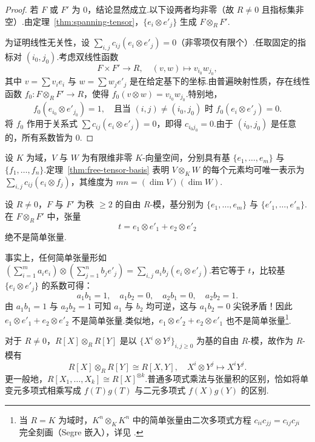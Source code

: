 \begin{proof}
若 $F$ 或 $F'$ 为 $0$，结论显然成立.以下设两者均非零（故 $R \neq 0$ 且指标集非空）.由定理~\ref{thm:spanning-tensor}，$\{e_i \otimes e'_j\}$ 生成 $F \otimes_R F'$.

为证明线性无关性，设 $\sum_{i, j} c_{ij} (e_i \otimes e'_j) = 0$（非零项仅有限个）.任取固定的指标对 $(i_0, j_0)$.考虑双线性函数
\[
  F \times F' \to R, \quad (v, w) \mapsto v_{i_0} w_{j_0},
\]
其中 $v = \sum v_i e_i$ 与 $w = \sum w_j e'_j$ 是在给定基下的坐标.由普遍映射性质，存在线性函数 $f_0 \colon F \otimes_R F' \to R$，使得 $f_0(v \otimes w) = v_{i_0} w_{j_0}$.特别地，
\[
  f_0(e_{i_0} \otimes e'_{j_0}) = 1, \quad\text{且当 }(i, j) \neq (i_0, j_0)\text{ 时 } f_0(e_i \otimes e'_j) = 0.
\]
将 $f_0$ 作用于关系式 $\sum c_{ij} (e_i \otimes e'_j) = 0$，即得 $c_{i_0 j_0} = 0$.由于 $(i_0, j_0)$ 是任意的，所有系数皆为 $0$.
\end{proof}

\begin{example}\label{ex:vector-spaces-tensor}
设 $K$ 为域，$V$ 与 $W$ 为有限维非零 $K$-向量空间，分别具有基 $\{e_1, \dots, e_m\}$ 与 $\{f_1, \dots, f_n\}$.定理~\ref{thm:free-tensor-basis} 表明 $V \otimes_K W$ 的每个元素均可唯一表示为 $\sum_{i,j} c_{ij} (e_i \otimes f_j)$，其维度为 $mn = (\dim V)(\dim W)$.
\end{example}

\begin{example}\label{ex:nonelementary}
设 $R \neq 0$，$F$ 与 $F'$ 为秩 $\geq 2$ 的自由 $R$-模，基分别为 $\{e_1, \dots, e_m\}$ 与 $\{e'_1, \dots, e'_n\}$.在 $F \otimes_R F'$ 中，张量
\[
  t = e_1 \otimes e'_1 + e_2 \otimes e'_2
\]
绝不是简单张量.

事实上，任何简单张量形如 $\left(\sum_{i=1}^m a_i e_i\right) \otimes \left(\sum_{j=1}^n b_j e'_j\right) = \sum_{i,j} a_i b_j (e_i \otimes e'_j)$.若它等于 $t$，比较基 $\{e_i \otimes e'_j\}$ 的系数可得：
\[
  a_1 b_1 = 1, \quad a_1 b_2 = 0, \quad a_2 b_1 = 0, \quad a_2 b_2 = 1.
\]
由 $a_1 b_1 = 1$ 与 $a_2 b_2 = 1$ 可知 $a_1$ 与 $b_2$ 均可逆，这与 $a_1 b_2 = 0$ 尖锐矛盾！因此 $e_1 \otimes e'_1 + e_2 \otimes e'_2$ 不是简单张量.类似地，$e_1 \otimes e'_2 + e_2 \otimes e'_1$ 也不是简单张量\footnote{当 $R = K$ 为域时，$K^n \otimes_K K^n$ 中的简单张量由二次多项式方程 $c_{ii} c_{jj} = c_{ij} c_{ji}$ 完全刻画（Segre 嵌入），详见 \cite{grone}.}.
\end{example}

\begin{example}\label{ex:poly-tensor}
对于 $R \neq 0$，$R[X] \otimes_R R[Y]$ 是以 $\{X^i \otimes Y^j\}_{i,j \geq 0}$ 为基的自由 $R$-模，故作为 $R$-模有
\[
  R[X] \otimes_R R[Y] \cong R[X, Y], \quad X^i \otimes Y^j \mapsto X^i Y^j.
\]
更一般地，$R[X_1, \dots, X_k] \cong R[X]^{\otimes k}$.普通多项式乘法与张量积的区别，恰如将单变元多项式相乘写成 $f(T)g(T)$ 与二元多项式 $f(X)g(Y)$ 的区别.
\end{example}

